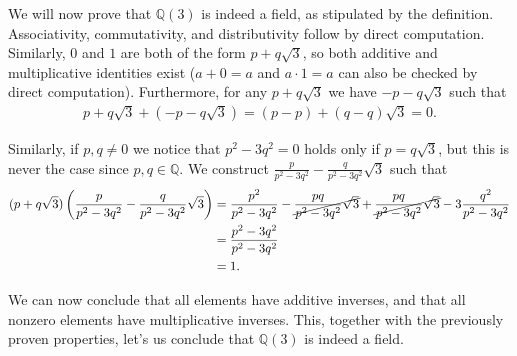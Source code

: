 \begin{exmp}
  We will now prove that $ \mathbb{Q} (3)$ is indeed a field, as stipulated by the definition. Associativity,  commutativity, and distributivity follow by direct computation. Similarly, $0$ and $1$ are both of the form $p + q \sqrt 3$, so both additive and multiplicative identities exist ($a + 0 = a$ and $a \cdot 1 = a$ can also be checked by direct computation). Furthermore, for any $p + q \sqrt 3$ we have $-p -q \sqrt 3$ such that 
  \begin{align*}
    p + q\sqrt 3 + (- p - q\sqrt 3) = (p - p) + (q - q) \sqrt 3 = 0.
  \end{align*}

  Similarly, if $p, q \neq 0$ we notice that $p ^2 - 3 q ^2 = 0$ holds only if $p = q \sqrt 3$, but this is never the case since $p, q \in \mathbb{Q}$. We construct $\frac p {p ^2 - 3 q ^2 } - \frac q {p ^2 - 3 q ^2 } \sqrt 3$ such that
  \begin{align*}
    (p + q \sqrt 3)\left(\frac p {p ^2 - 3 q ^2 } - \frac q {p ^2 - 3 q ^2 } \sqrt 3\right)
    &= \frac {p ^2}  {p ^2 - 3 q ^2 } - \cancel{\frac {pq} {p ^2 - 3 q ^2 } \sqrt 3}
    + \cancel{\frac {pq}  {p ^2 - 3 q ^2 } \sqrt 3} - 3\frac {q ^2 } {p ^2 - 3 q ^2 }
    \\&= \frac{p ^2 - 3 q ^2 }{p ^2 - 3 q ^2 }
    \\&= 1.
  \end{align*}

  We can now conclude that all elements have additive inverses, and that all nonzero elements have multiplicative inverses. This, together with the previously proven properties, let's us conclude that $\mathbb{Q} (3)$ is indeed a field.
\end{exmp}
